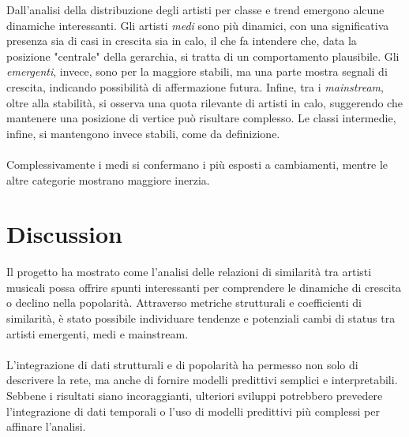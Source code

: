 \documentclass[sigchi]{acmart}
\begin{document}
\noindent Dall'analisi della distribuzione degli artisti per classe e trend emergono alcune dinamiche interessanti. Gli artisti \textit{medi} sono più dinamici, con una significativa presenza sia di casi in crescita sia in calo, il che fa intendere che, data la posizione "centrale" della gerarchia, si tratta di un comportamento plausibile. Gli \textit{emergenti}, invece, sono per la maggiore stabili, ma una parte mostra segnali di crescita, indicando possibilità di affermazione futura. Infine, tra i \textit{mainstream}, oltre alla stabilità, si osserva una quota rilevante di artisti in calo, suggerendo che mantenere una posizione di vertice può risultare complesso. Le classi intermedie, infine, si mantengono invece stabili, come da definizione. \\ \\ Complessivamente i medi si confermano i più esposti a cambiamenti, mentre le altre categorie mostrano maggiore inerzia.


\section{Discussion}
Il progetto ha mostrato come l'analisi delle relazioni di similarità tra artisti musicali possa offrire spunti interessanti per comprendere le dinamiche di crescita o declino nella popolarità. Attraverso metriche strutturali e coefficienti di similarità, è stato possibile individuare tendenze e potenziali cambi di status tra artisti emergenti, medi e mainstream. \\ \\ L'integrazione di dati strutturali e di popolarità ha permesso non solo di descrivere la rete, ma anche di fornire modelli predittivi semplici e interpretabili. Sebbene i risultati siano incoraggianti, ulteriori sviluppi potrebbero prevedere l'integrazione di dati temporali o l'uso di modelli predittivi più complessi per affinare l'analisi.



\end{document}
